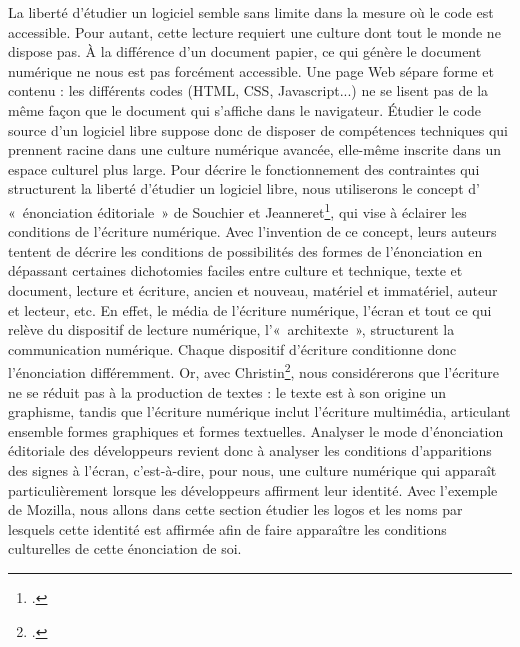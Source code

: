 \documentclass{FramateX}
\begin{document}
\begin{refsection}
La liberté d'étudier un logiciel semble sans limite dans la mesure où le
code est accessible. Pour autant, cette lecture requiert une culture
dont tout le monde ne dispose pas. À la différence d'un document
papier, ce qui génère le document numérique ne nous est pas forcément
accessible. Une page Web sépare forme et contenu : les différents codes
(HTML, CSS, Javascript...) ne se lisent pas de la même façon que le
document qui s'affiche dans le navigateur. Étudier le code source d'un
logiciel libre suppose donc de disposer de compétences techniques qui
prennent racine dans une culture numérique avancée, elle-même inscrite
dans un espace culturel plus large. Pour décrire le fonctionnement des
contraintes qui structurent la liberté d'étudier un logiciel libre,
nous utiliserons le concept d' «~énonciation éditoriale~» de Souchier
et Jeanneret\footnote{\cite{souchierlenonciation2005}.}, qui vise à éclairer les conditions de l'écriture
numérique. Avec l'invention de ce concept, leurs auteurs tentent de
décrire les conditions de possibilités des formes de l'énonciation en
dépassant certaines dichotomies faciles entre culture et technique,
texte et document, lecture et écriture, ancien et nouveau, matériel et
immatériel, auteur et lecteur, etc. En effet, le média de l'écriture
numérique, l'écran et tout ce qui relève du dispositif de lecture
numérique, l'«~architexte~», structurent la communication numérique.
Chaque dispositif d'écriture conditionne donc l'énonciation
différemment. Or, avec Christin\footnote{\cite{Christin2011}.}, nous considérerons que
l'écriture ne se réduit pas à la production de textes : le texte est à
son origine un graphisme, tandis que l'écriture numérique inclut
l'écriture multimédia, articulant ensemble formes graphiques et formes
textuelles. Analyser le mode d'énonciation éditoriale des développeurs
revient donc à analyser les conditions d'apparitions des signes à
l'écran, c'est-à-dire, pour nous, une culture numérique qui apparaît
particulièrement lorsque les développeurs affirment leur identité. Avec
l'exemple de Mozilla, nous allons dans cette section étudier les logos
et les noms par lesquels cette identité est affirmée afin de faire
apparaître les conditions culturelles de cette énonciation de soi. 


\end{refsection}
\end{document}
